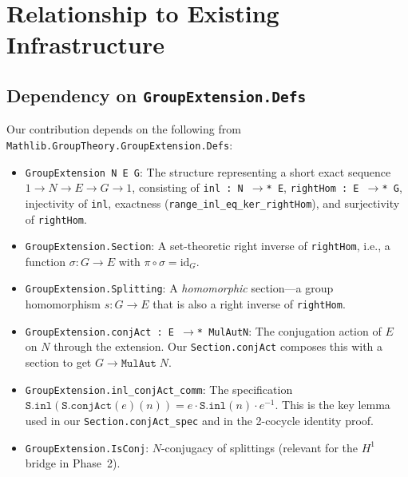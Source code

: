 \documentclass[11pt]{article}
\begin{document}
\section{Relationship to Existing Infrastructure}\label{sec:existing}

\subsection{Dependency on \texttt{GroupExtension.Defs}}

Our contribution depends on the following from \texttt{Mathlib.GroupTheory.GroupExtension.Defs}:

\begin{itemize}[nosep]
\item \texttt{GroupExtension N E G}: The structure representing a short exact sequence
  $1 \to N \to E \to G \to 1$, consisting of \texttt{inl : N $\to$* E},
  \texttt{rightHom : E $\to$* G}, injectivity of \texttt{inl}, exactness
  (\texttt{range\_inl\_eq\_ker\_rightHom}), and surjectivity of \texttt{rightHom}.

\item \texttt{GroupExtension.Section}: A set-theoretic right inverse of \texttt{rightHom},
  i.e., a function $\sigma : G \to E$ with $\pi \circ \sigma = \mathrm{id}_G$.

\item \texttt{GroupExtension.Splitting}: A \emph{homomorphic} section---a group
  homomorphism $s : G \to E$ that is also a right inverse of \texttt{rightHom}.

\item \texttt{GroupExtension.conjAct : E $\to$* MulAut\;N}: The conjugation action of
  $E$ on $N$ through the extension. Our \texttt{Section.conjAct} composes this with
  a section to get $G \to \texttt{MulAut}\;N$.

\item \texttt{GroupExtension.inl\_conjAct\_comm}: The specification
  $\texttt{S.inl}(\texttt{S.conjAct}(e)(n)) = e \cdot \texttt{S.inl}(n) \cdot e^{-1}$.
  This is the key lemma used in our \texttt{Section.conjAct\_spec} and in the
  2-cocycle identity proof.

\item \texttt{GroupExtension.IsConj}: $N$-conjugacy of splittings (relevant for the
  $H^1$ bridge in Phase~2).
\end{itemize}
\end{document}
